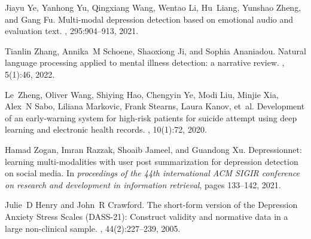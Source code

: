 \begin{thebibliography}{10}
Jiayu Ye, Yanhong Yu, Qingxiang Wang, Wentao Li, Hu~Liang, Yunshao Zheng, and
  Gang Fu.
\newblock Multi-modal depression detection based on emotional audio and
  evaluation text.
, 295:904--913, 2021.

Tianlin Zhang, Annika~M Schoene, Shaoxiong Ji, and Sophia Ananiadou.
\newblock Natural language processing applied to mental illness detection: a
  narrative review.
, 5(1):46, 2022.

Le~Zheng, Oliver Wang, Shiying Hao, Chengyin Ye, Modi Liu, Minjie Xia, Alex~N
  Sabo, Liliana Markovic, Frank Stearns, Laura Kanov, et~al.
\newblock Development of an early-warning system for high-risk patients for
  suicide attempt using deep learning and electronic health records.
, 10(1):72, 2020.

Hamad Zogan, Imran Razzak, Shoaib Jameel, and Guandong Xu.
\newblock Depressionnet: learning multi-modalities with user post summarization
  for depression detection on social media.
\newblock In {\em proceedings of the 44th international ACM SIGIR conference on
  research and development in information retrieval}, pages 133--142, 2021.

Julie~D Henry and John~R Crawford.
\newblock The short-form version of the Depression Anxiety Stress Scales (DASS-21): Construct validity and normative data in a large non-clinical sample.
, 44(2):227--239, 2005.



\end{thebibliography}
